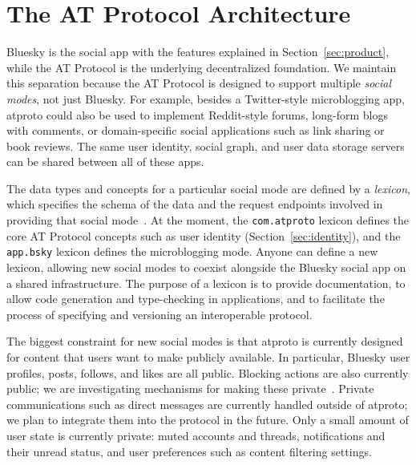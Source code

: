 \documentclass[sigconf]{acmart}
\begin{document}
\section{The AT Protocol Architecture}\label{sec:architecture}

Bluesky is the social app with the features explained in Section~\ref{sec:product}, while the AT Protocol is the underlying decentralized foundation.
We maintain this separation because the AT Protocol is designed to support multiple \emph{social modes}, not just Bluesky.
For example, besides a Twitter-style microblogging app, atproto could also be used to implement Reddit-style forums, long-form blogs with comments, or domain-specific social applications such as link sharing or book reviews.
The same user identity, social graph, and user data storage servers can be shared between all of these apps.

The data types and concepts for a particular social mode are defined by a \emph{lexicon}, which specifies the schema of the data and the request endpoints involved in providing that social mode~\cite{AtProtoSpecs}.
At the moment, the \texttt{com.atproto} lexicon defines the core AT Protocol concepts such as user identity (Section~\ref{sec:identity}), and the \texttt{app.bsky} lexicon defines the microblogging mode.
Anyone can define a new lexicon, allowing new social modes to coexist alongside the Bluesky social app on a shared infrastructure.
The purpose of a lexicon is to provide documentation, to allow code generation and type-checking in applications, and to facilitate the process of specifying and versioning an interoperable protocol.

The biggest constraint for new social modes is that atproto is currently designed for content that users want to make publicly available.
In particular, Bluesky user profiles, posts, follows, and likes are all public.
Blocking actions are also currently public; we are investigating mechanisms for making these private~\cite{PublicBlocks,PrivateBlocks}.
Private communications such as direct messages are currently handled outside of atproto; we plan to integrate them into the protocol in the future.
Only a small amount of user state is currently private: muted accounts and threads, notifications and their unread status, and user preferences such as content filtering settings.
\end{document}
